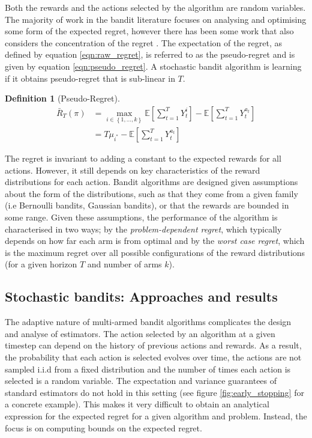 \documentclass[11pt,a4paper,twoside]{report}
\newcommand{\E}[1]{\mathbb E\left[{#1}\right]}
\newcommand{\set}[1]{\left\{#1\right\}}
\newcommand{\eqn}[1]{\begin{align}#1\end{align}}
\newcommand{\cfb}[2]{{#1}_t^{#2}} %
\newcommand{\regret}{\bar{R}_{T}} %
\theoremstyle{plain}
\theoremstyle{definition}
\newtheorem{definition}[theorem]{Definition}
\begin{document}
Both the rewards and the actions selected by the algorithm are random variables. The majority of work in the bandit literature focuses on analysing and optimising some form of the expected regret, however there has been some work that also considers the concentration of the regret \citep{Auer1995,Audibert2007,Audibert2009exploration}. The expectation of the regret, as defined by equation \ref{eqn:raw_regret}, is referred to as the pseudo-regret \citep{Bubeck2012} and is given by equation \ref{eqn:pseudo_regret}. A stochastic bandit algorithm is learning if it obtains pseudo-regret that is sub-linear in $T$. 

\vspace{0.5cm}
\begin{definition}[Pseudo-Regret]
\eqn{
\label{eqn:pseudo_regret}
\regret(\pi) &= \max_{i \in \set{1,...,k}}\E{\sum_{t=1}^T{\cfb{Y}{i}}} - \E{\sum_{t=1}^T{\cfb{Y}{a_t}}} \\
&= T\mu_{i^*} - \E{\sum_{t=1}^T{\cfb{Y}{a_t}}}
}
\end{definition}

The regret is invariant to adding a constant to the expected rewards for all actions. However, it still depends on key characteristics of the reward distributions for each action. Bandit algorithms are designed given assumptions about the form of the distributions, such as that they come from a given family (i.e Bernoulli bandits, Gaussian bandits), or that the rewards are bounded in some range. Given these assumptions, the performance of the algorithm is characterised in two ways; by the \emph{problem-dependent regret}, which typically depends on how far each arm is from optimal and by the \emph{worst case regret}, which is the maximum regret over all possible configurations of the reward distributions (for a given horizon $T$ and number of arms $k$).

\subsection{Stochastic bandits: Approaches and results}
\label{sec:stochastic-bandit}

The adaptive nature of multi-armed bandit algorithms complicates the design and analyse of estimators. The action selected by an algorithm at a given timestep can depend on the history of previous actions and rewards. As a result, the probability that each action is selected evolves over time, the actions are not sampled i.i.d from a fixed distribution and the number of times each action is selected is a random variable. The expectation and variance guarantees of standard estimators do not hold in this setting (see figure \ref{fig:early_stopping} for a concrete example). This makes it very difficult to  obtain an analytical expression for the expected regret for a given algorithm and problem. Instead, the focus is on computing bounds on the expected regret. 
\end{document}
